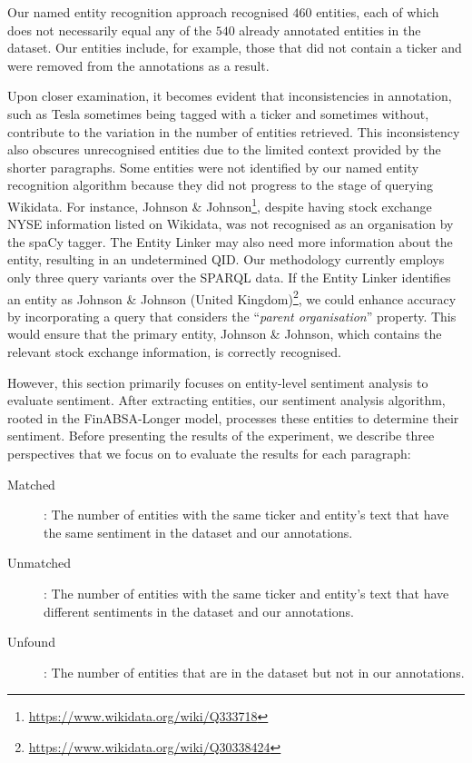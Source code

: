 Our named entity recognition approach recognised $460$ entities, each of which does not necessarily equal any of the $540$ already annotated entities in the dataset. Our entities include, for example, those that did not contain a ticker and were removed from the annotations as a result. 

Upon closer examination, it becomes evident that inconsistencies in annotation, such as Tesla sometimes being tagged with a ticker and sometimes without, contribute to the variation in the number of entities retrieved. This inconsistency also obscures unrecognised entities due to the limited context provided by the shorter paragraphs.
Some entities were not identified by our named entity recognition algorithm because they did not progress to the stage of querying Wikidata. For instance, Johnson \& Johnson\footnote{\href{https://www.wikidata.org/wiki/Q333718}{https://www.wikidata.org/wiki/Q333718}}, despite having stock exchange NYSE information listed on Wikidata, was not recognised as an organisation by the spaCy tagger. The Entity Linker may also need more information about the entity, resulting in an undetermined QID. Our methodology currently employs only three query variants over the SPARQL data. If the Entity Linker identifies an entity as Johnson \& Johnson (United Kingdom)\footnote{\href{https://www.wikidata.org/wiki/Q30338424}{https://www.wikidata.org/wiki/Q30338424}}, we could enhance accuracy by incorporating a query that considers the ``\textit{parent organisation}'' property. This would ensure that the primary entity, Johnson \& Johnson, which contains the relevant stock exchange information, is correctly recognised.

However, this section primarily focuses on entity-level sentiment analysis to evaluate sentiment. After extracting entities, our sentiment analysis algorithm, rooted in the FinABSA-Longer model, processes these entities to determine their sentiment. Before presenting the results of the experiment, we describe three perspectives that we focus on to evaluate the results for each paragraph:

\begin{description}
    \item [Matched]: The number of entities with the same ticker and entity's text that have the same sentiment in the dataset and our annotations.
    \item [Unmatched]: The number of entities with the same ticker and entity's text that have different sentiments in the dataset and our annotations.
    \item [Unfound]: The number of entities that are in the dataset but not in our annotations.
\end{description}

